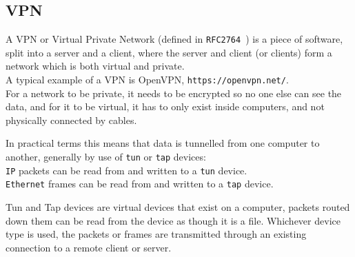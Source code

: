 \subsection{VPN}
A VPN or Virtual Private Network (defined in \texttt{RFC2764}~\cite{rfc2764}) is a piece of software, split into a server and a client, where the server and client (or clients) form a network which is both virtual and private.\\
A typical example of a VPN is OpenVPN, \texttt{https://openvpn.net/}.\\
For a network to be private, it needs to be encrypted so no one else can see the data, and for it to be virtual, it has to only exist inside computers, and not physically connected by cables.\par In practical terms this means that data is tunnelled from one computer to another, generally by use of \texttt{tun} or \texttt{tap} devices:\\
\texttt{IP} packets can be read from and written to a \texttt{tun} device.\\
\texttt{Ethernet} frames can be read from and written to a \texttt{tap} device.\par
Tun and Tap devices are virtual devices that exist on a computer, packets routed down them can be read from the device as though it is a file.
Whichever device type is used, the packets or frames are transmitted through an existing connection to a remote client or server.
